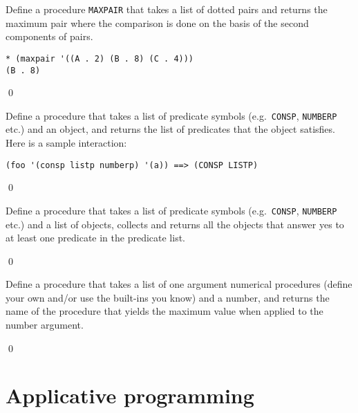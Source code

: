 \documentclass[a4paper,11pt]{article}
\begin{document}
\begin{uexercise}
Define a procedure \Verb+MAXPAIR+ that takes a list of dotted pairs and returns the maximum pair where the comparison is done on the basis of the second components of pairs. 

\begin{ucodeframe}
\begin{Verbatim}
* (maxpair '((A . 2) (B . 8) (C . 4)))
(B . 8)
\end{Verbatim}
\end{ucodeframe}

\qed
\end{uexercise}

\begin{uexercise}
Define a procedure that takes a list of predicate symbols (e.g.\ \Verb+CONSP+, \Verb+NUMBERP+ etc.) and an object, and returns the list of predicates that the object satisfies. Here is a sample interaction:

\begin{ucodeframe}
\begin{Verbatim}
(foo '(consp listp numberp) '(a)) ==> (CONSP LISTP)
\end{Verbatim}
\end{ucodeframe}

\qed
\end{uexercise}

\begin{uexercise}
Define a procedure that takes a list of predicate symbols (e.g.\ \Verb+CONSP+, \Verb+NUMBERP+ etc.) and a list of objects, collects and returns all the objects that answer yes to at least one predicate in the predicate list.

\qed
\end{uexercise}

\begin{uexercise}
Define a procedure that takes a list of one argument numerical procedures (define your own and/or use the built-ins you know) and a number, and returns the name of the procedure that yields the maximum value when applied to the number argument.

\qed
\end{uexercise}

\noindent\hrulefill

\newpage

\section{Applicative programming}
\end{document}
